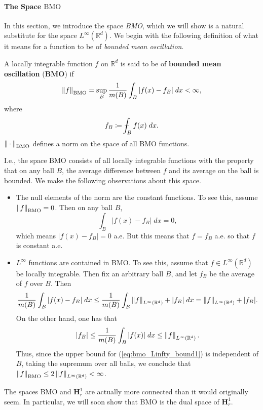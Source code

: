 \documentclass{article}
\def\Xint#1{\mathchoice
	{\XXint\displaystyle\textstyle{#1}}%
	{\XXint\textstyle\scriptstyle{#1}}%
	{\XXint\scriptstyle\scriptscriptstyle{#1}}%
	{\XXint\scriptscriptstyle\scriptscriptstyle{#1}}%
	\!\int}
\def\XXint#1#2#3{{\setbox0=\hbox{$#1{#2#3}{\int}$ }
		\vcenter{\hbox{$#2#3$ }}\kern-0.6\wd0}}
\def\dashint{\Xint-}
\begin{document}
\paragraph{The Space $\text{BMO}$}
In this section, we introduce the space \textit{BMO}, which we will show is a natural substitute for the space $L^{\infty}(\mathbb{R}^{d})$. We begin with the following definition of what it means for a function to be of \textit{bounded mean oscillation}. 

\begin{definition}
	A locally integrable function $f$ on $\mathbb{R}^{d}$ is said to be of \textbf{bounded mean oscillation} (\textbf{BMO}) if 
	\begin{equation}
		\left\Vert f \right\Vert_{\textup{BMO}} = \sup_{B}\frac{1}{m(B)}\int_{B}|f(x) - f_{B}|\;dx < \infty, 
		\label{eq:BMOnorm}
	\end{equation} 
	where 
	\begin{equation*}
		f_{B} \coloneqq \dashint_{B}f(x)\;dx. 
	\end{equation*}
	$\left\Vert \hspace{2pt}\cdot\hspace{2pt} \right\Vert_{\textup{BMO}}$ defines a norm on the space of all BMO functions. 
\end{definition} 
I.e., the space BMO consists of all locally integrable functions with the property that on any ball $B$, the average difference between $f$ and its average on the ball is bounded. We make the following observations about this space. 
\begin{itemize}[itemsep =-2pt]
	\item The null elements of the norm are the constant functions. To see this, assume $\left\Vert f \right\Vert_{\text{BMO}} = 0$. Then on any ball $B$, 
	\begin{equation*}
		\int_{B}|f(x) - f_{B}|\;dx = 0, 
	\end{equation*} 
	which means $|f(x)- f_{B}| = 0$ a.e. But this means that $f = f_{B}$ a.e. so that $f$ is constant a.e. 
	\item $L^{\infty}$ functions are contained in BMO. To see this, assume that $f \in L^{\infty}(\mathbb{R}^{d})$ be locally integrable. Then fix an arbitrary ball $B$, and let $f_{B}$ be the average of $f$ over $B$. Then 
	\begin{equation}
		\frac{1}{m(B)} \int_{B}|f(x) - f_{B}|\;dx \leq \frac{1}{m(B)}\int_{B}\left\Vert f \right\Vert_{L^{\infty}(\mathbb{R}^{d})} + |f_{B}|\;dx = \left\Vert f \right\Vert_{L^{\infty}(\mathbb{R}^{d})} + |f_{B}|. 
		\label{eq:bmo_Linfty_bound1}
	\end{equation} 
	On the other hand, one has that 
	\begin{equation*}
		|f_{B}| \leq \frac{1}{m(B)}\int_{B}|f(x)|\;dx \leq \left\Vert f \right\Vert_{L^{\infty}(\mathbb{R}^{d})}. 
	\end{equation*} 
	Thus, since the upper bound for (\ref{eq:bmo_Linfty_bound1}) is independent of $B$, taking the supremum over all balls, we conclude that $\left\Vert f \right\Vert_{\text{BMO}}\leq 2\left\Vert f \right\Vert_{L^{\infty}(\mathbb{R}^{d})} < \infty$. 
\end{itemize} 
The spaces BMO and $\mathbf{H}^{1}_{r}$ are actually more connected than it would originally seem. In particular, we will soon show that BMO is the dual space of $\mathbf{H}^{1}_{r}$. 
\end{document}
